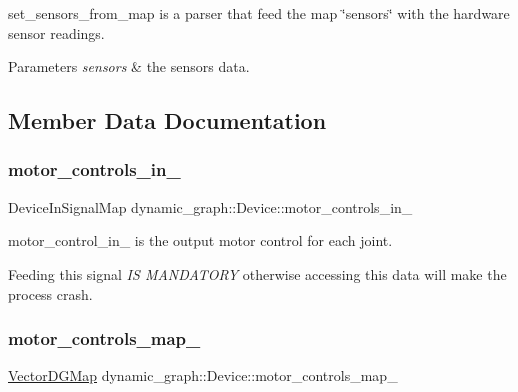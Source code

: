 set\+\_\+sensors\+\_\+from\+\_\+map is a parser that feed the map \char`\"{}sensors\char`\"{} with the hardware sensor readings. 


\begin{DoxyParams}{Parameters}
{\em sensors} & the sensors data. \\
\hline
\end{DoxyParams}


\subsection{Member Data Documentation}
\mbox{\label{classdynamic__graph_1_1Device_a77f0617d7b53fb47d77af7557521daf4}} 
\subsubsection{\texorpdfstring{motor\+\_\+controls\+\_\+in\+\_\+}{motor\_controls\_in\_}}
{\footnotesize\ttfamily Device\+In\+Signal\+Map dynamic\+\_\+graph\+::\+Device\+::motor\+\_\+controls\+\_\+in\+\_\+}



motor\+\_\+control\+\_\+in\+\_\+ is the output motor control for each joint. 

Feeding this signal {\itshape IS M\+A\+N\+D\+A\+T\+O\+RY} otherwise accessing this data will make the process crash. \mbox{\label{classdynamic__graph_1_1Device_a9d866a7e294a7445fb88dee8d8a80851}} 
\subsubsection{\texorpdfstring{motor\+\_\+controls\+\_\+map\+\_\+}{motor\_controls\_map\_}}
{\footnotesize\ttfamily \hyperlink{namespacedynamic__graph_abd184187f3bc15df5e227d866529e4a7}{Vector\+D\+G\+Map} dynamic\+\_\+graph\+::\+Device\+::motor\+\_\+controls\+\_\+map\+\_\+}



